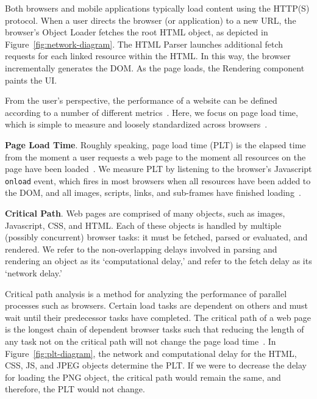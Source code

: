 Both browsers and mobile applications typically load content using the HTTP(S) protocol. When a user directs the browser (or application) to a new URL, the browser's Object Loader fetches the root HTML object, as depicted
in Figure~\ref{fig:network-diagram}. The HTML Parser launches additional
fetch requests for each linked resource within the HTML. In this way, the browser incrementally generates the DOM.
As the page loads, the Rendering component paints the UI.

From the user's perspective, the performance of a website can be defined according to a number of different metrics~\cite{above-the-fold,speed-index}. Here,
we focus on page load time, which is simple to measure
and loosely standardized across browsers~\cite{w3c-onload}.

\textbf{Page Load Time}. Roughly speaking, page load time (PLT) is the elapsed time from the moment a user requests a web page to the moment all resources on the page have been loaded~\cite{page-speed}.
We measure PLT by listening to the browser's Javascript \texttt{onload} event,
which fires in most browsers when all resources have been added to the DOM, and all images,
scripts, links, and sub-frames have finished loading~\cite{w3c-onload}.



\textbf{Critical Path}. Web pages are comprised of many objects, such as images, Javascript, CSS, and HTML.
Each of these objects is handled by multiple (possibly concurrent) browser tasks: it must be
fetched, parsed or evaluated, and rendered. We refer to the non-overlapping
delays involved in parsing and rendering an object as its `computational
delay,' and refer to the fetch delay as its `network delay.'

Critical path analysis is a method for analyzing the performance of parallel
processes such as browsers.
Certain load tasks are dependent on others and must wait until their
predecessor tasks have completed. The critical path of a web page is the longest chain of dependent browser tasks such that reducing the length of any task not on the critical
path will not change the page load time~\cite{sarkar1987partitioning}.
In Figure~\ref{fig:plt-diagram}, the network and computational delay for the HTML, CSS, JS, and JPEG
objects determine the PLT. If we were to decrease the delay for loading the
PNG object, the critical path would remain the same, and therefore, the PLT would not change.


